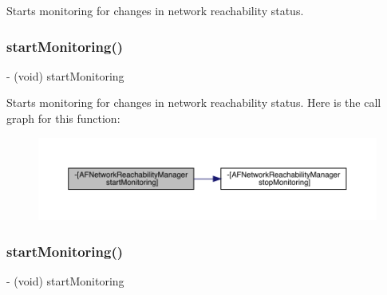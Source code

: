 Starts monitoring for changes in network reachability status. \mbox{\label{interface_a_f_network_reachability_manager_aa455bdcd0711021421aef6e2f87f62d7}} 
\subsubsection{\texorpdfstring{start\+Monitoring()}{startMonitoring()}\hspace{0.1cm}{\footnotesize\ttfamily [2/3]}}
{\footnotesize\ttfamily -\/ (void) start\+Monitoring \begin{DoxyParamCaption}{ }\end{DoxyParamCaption}}

Starts monitoring for changes in network reachability status. Here is the call graph for this function\+:\nopagebreak
\begin{figure}[H]
\begin{center}
\leavevmode
\includegraphics[width=350pt]{interface_a_f_network_reachability_manager_aa455bdcd0711021421aef6e2f87f62d7_cgraph}
\end{center}
\end{figure}
\mbox{\label{interface_a_f_network_reachability_manager_aa455bdcd0711021421aef6e2f87f62d7}} 
\subsubsection{\texorpdfstring{start\+Monitoring()}{startMonitoring()}\hspace{0.1cm}{\footnotesize\ttfamily [3/3]}}
{\footnotesize\ttfamily -\/ (void) start\+Monitoring \begin{DoxyParamCaption}{ }\end{DoxyParamCaption}}

